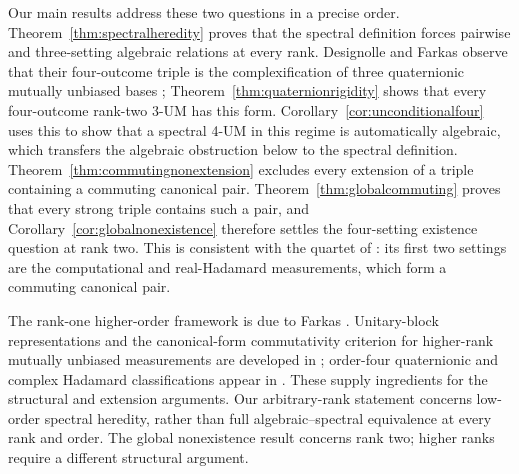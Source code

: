 \documentclass[11pt]{article}
\begin{document}
Our main results address these two questions in a precise order.
Theorem~\ref{thm:spectralheredity} proves that the spectral definition
forces pairwise and three-setting algebraic relations at every rank.
Designolle and Farkas observe that their four-outcome triple is the
complexification of three quaternionic mutually unbiased bases \cite{DF};
Theorem~\ref{thm:quaternionrigidity} shows that every four-outcome
rank-two 3-UM has this form.
Corollary~\ref{cor:unconditionalfour} uses this to show that a spectral
4-UM in this regime is automatically algebraic, which transfers the
algebraic obstruction below to the spectral definition.
Theorem~\ref{thm:commutingnonextension} excludes every extension of a
triple containing a commuting canonical pair. Theorem~\ref{thm:globalcommuting} proves that every strong triple
contains such a pair, and Corollary~\ref{cor:globalnonexistence}
therefore settles the four-setting existence question at rank two.
This is consistent with the quartet of \cite[App.~C]{DF}: its first two
settings are the computational and real-Hadamard measurements, which form
a commuting canonical pair.

The rank-one higher-order framework is due to Farkas \cite{F}.
Unitary-block representations and the canonical-form commutativity
criterion for higher-rank mutually unbiased measurements are developed in
\cite{FKN}; order-four
quaternionic and complex Hadamard classifications appear in \cite{CD,TZ}.
These supply ingredients for the structural and extension arguments.
Our arbitrary-rank statement concerns low-order spectral heredity, rather
than full algebraic--spectral equivalence at every rank and order.
The global nonexistence result concerns rank two; higher ranks require
a different structural argument.
\end{document}

